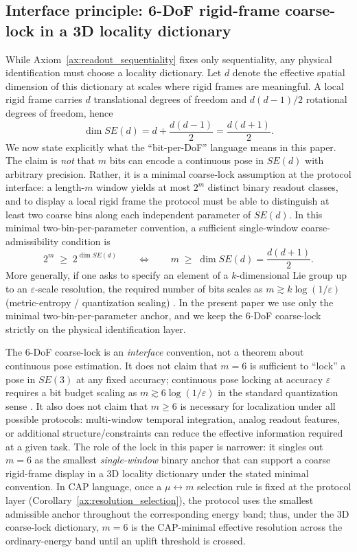 \subsection{Interface principle: 6-DoF rigid-frame coarse-lock in a 3D locality dictionary}
\label{subsec:6dof_lock}
While Axiom~\ref{ax:readout_sequentiality} fixes only sequentiality, any physical identification must choose a locality dictionary.
Let $d$ denote the effective spatial dimension of this dictionary at scales where rigid frames are meaningful.
A local rigid frame carries $d$ translational degrees of freedom and $d(d-1)/2$ rotational degrees of freedom, hence
\[
\dim SE(d)=d+\frac{d(d-1)}{2}=\frac{d(d+1)}{2}.
\]
We now state explicitly what the ``bit-per-DoF'' language means in this paper.
The claim is \emph{not} that $m$ bits can encode a continuous pose in $SE(d)$ with arbitrary precision.
Rather, it is a minimal coarse-lock assumption at the protocol interface: a length-$m$ window yields at most $2^m$ distinct binary readout classes, and to display a local rigid frame the protocol must be able to distinguish at least two coarse bins along each independent parameter of $SE(d)$.
In this minimal two-bin-per-parameter convention, a sufficient single-window coarse-admissibility condition is
\[
2^m\;\ge\;2^{\dim SE(d)}
\qquad\Longleftrightarrow\qquad
m\;\ge\;\dim SE(d)=\frac{d(d+1)}{2}.
\]
More generally, if one asks to specify an element of a $k$-dimensional Lie group up to an $\varepsilon$-scale resolution, the required number of bits scales as $m\gtrsim k\log(1/\varepsilon)$ (metric-entropy / quantization scaling) \cite{GrayNeuhoff1998Quantization,CoverThomas2006}.
In the present paper we use only the minimal two-bin-per-parameter anchor, and we keep the 6-DoF coarse-lock strictly on the physical identification layer.
\begin{remark}\label{rem:6dof_lock_scope}
The 6-DoF coarse-lock is an \emph{interface} convention, not a theorem about continuous pose estimation.
It does not claim that $m=6$ is sufficient to ``lock'' a pose in $SE(3)$ at any fixed accuracy; continuous pose locking at accuracy $\varepsilon$ requires a bit budget scaling as $m\gtrsim 6\log(1/\varepsilon)$ in the standard quantization sense \cite{GrayNeuhoff1998Quantization,CoverThomas2006}.
It also does not claim that $m\ge 6$ is necessary for localization under all possible protocols: multi-window temporal integration, analog readout features, or additional structure/constraints can reduce the effective information required at a given task.
The role of the lock in this paper is narrower: it singles out $m=6$ as the smallest \emph{single-window} binary anchor that can support a coarse rigid-frame display in a $3$D locality dictionary under the stated minimal convention.
In CAP language, once a $\mu\leftrightarrow m$ selection rule is fixed at the protocol layer (Corollary~\ref{ax:resolution_selection}), the protocol uses the smallest admissible anchor throughout the corresponding energy band; thus, under the $3$D coarse-lock dictionary, $m=6$ is the CAP-minimal effective resolution across the ordinary-energy band until an uplift threshold is crossed.
\end{remark}

